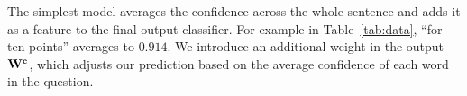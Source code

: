 \begin{comment}
The original Deep Averaging Network, or \textsc{dan}, classifier has
three sections: a "neural-bag-of-words" (\textsc{nbow}) encoder, which
composes all the words in the document into a single vector by
averaging the word vectors; a series of hidden transformations, which
give the network depth and allow it to amplify small distinctions
between composed documents; and a softmax predictor that outputs a class.

The encoded representation~$\textbf{r}$ is the averaged embeddings of
input words. The word vectors exist in an embedding
matrix~$\textbf{E}$, from which we can look up a specific word~$w$
with $\textbf{E}[w]$. The length of the document is~$N$. To compute
the composed representation~$r$, the \textsc{dan} averages all of the
word embeddings:
\begin{equation}
\textbf{r} = \frac{\sum_{i}^{N}\textbf{E}[w\textsubscript{i}]}{N}
\end{equation}

The network weights~$\textbf{W}$, consist of a weight-bias pair for each layer of
transformations~$(\textbf{W\textsuperscript{(h\textsubscript{i})}, b\textsuperscript{(h\textsubscript{i})}})$ for each layer $i$ in the list of
layers~$L$. To compute the hidden representations for each layer, the
\textsc{dan}  linearly transforms the input and then applies a nonlinearity:
$
\textbf{h\textsubscript{0}} = \sigma (\textbf{W\textsuperscript{(h\textsubscript{0})}}\textbf{r}+\textbf{b\textsuperscript{(h\textsubscript{0})}})
$.
Successive hidden representations~$h\textsubscript{i}$ are:
$
\textbf{h\textsubscript{i}} = \sigma (\textbf{W\textsuperscript{(h\textsubscript{i})}}\textbf{h\textsubscript{i-1}}+\textbf{b\textsuperscript{(h\textsubscript{i})}})
$.
The final layer in the \textsc{dan} is a softmax output:
$
\textbf{o} = \mathrm{softmax}(\textbf{W\textsuperscript{(o)}}\textbf{h\textsubscript{L}} + \textbf{b\textsuperscript{(o)}})
$.
moved to BACKGROUND
\end{comment}



The simplest model averages the confidence across the whole sentence
and adds it as a feature to the final output classifier.  For example
in Table~\ref{tab:data}, ``for ten points'' averages to $0.914$. We introduce an additional weight in the output~$\textbf{W\textsuperscript{c}}$, which adjusts our prediction based on the average confidence of each word in the question.


